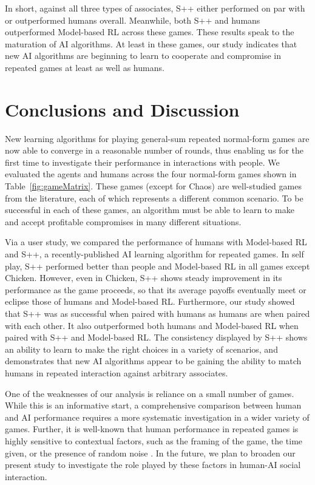 \documentclass[fleqn,10pt]{SelfArx}
\begin{document}
In short, against all three types of associates, S++ either performed on par with or outperformed humans overall.  Meanwhile, both S++ and humans outperformed Model-based RL across these games.  These results speak to the maturation of AI algorithms.  At least in these games, our study indicates that new AI algorithms are beginning to learn to cooperate and compromise in repeated games at least as well as humans.




\section{Conclusions and Discussion}

New learning algorithms for playing general-sum repeated normal-form games are now able to converge in a reasonable number of rounds, thus enabling us for the first time to investigate their performance in interactions with people. We evaluated the agents and humans across the four normal-form games shown in Table~\ref{fig:gameMatrix}. These games (except for Chaos) are well-studied games from the literature, each of which represents a different common scenario. To be successful in each of these games, an algorithm must be able to learn to make and accept profitable compromises in many different situations.

Via a user study, we compared the performance of humans with Model-based RL and S++, a recently-published AI learning algorithm for repeated games.  In self play, S++ performed better than people and Model-based RL in all games except Chicken.  However, even in Chicken, S++ shows steady improvement in its performance as the game proceeds, so that its average payoffs eventually meet or eclipse those of humans and Model-based RL.  Furthermore, our study showed that S++ was as successful when paired with humans as humans are when paired with each other.  It also outperformed both humans and Model-based RL when paired with S++ and Model-based RL.  The consistency displayed by S++ shows an ability to learn to make the right choices in a variety of scenarios, and demonstrates that new AI algorithms appear to be gaining the ability to match humans in repeated interaction against arbitrary associates.

One of the weaknesses of our analysis is reliance on a small number of games. While this is an informative start, a comprehensive comparison between human and AI performance requires a more systematic investigation in a wider variety of games. Further, it is well-known that human performance in repeated games is highly sensitive to contextual factors, such as the framing of the game, the time given, or the presence of random noise \cite{rand2013human,Dal:2011,Fudenberg:etal:2012}. In the future, we plan to broaden our present study to investigate the role played by these factors in human-AI social interaction.
\end{document}
